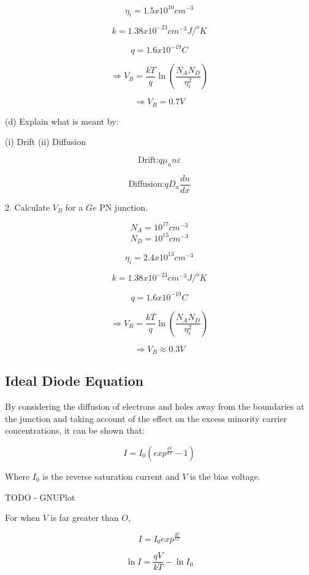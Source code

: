 \documentclass[a4paper,12pt]{article}
\begin{document}
\[ \eta_{i} = 1.5 x 10^{10} cm^{-3} \]

\[ k = 1.38 x 10^{-23} cm^{-3}  J/^{o}K \]

\[ q = 1.6 x 10^{-19} C \]

\[ \Rightarrow V_{B} = \frac{kT}{q} \ln{\left(\frac{N_{A}
N_{D}}{\eta_{i}^{2}}\right)}
\]

\[ \Rightarrow V_{B} = 0.7 V \]


(d) Explain what is meant by:

(i) Drift
(ii) Diffusion

\[ \mbox{Drift:} q \mu_{n} n \varepsilon \]

\[ \mbox{Diffusion:} q D_{n} \frac{dn}{dx} \]

2. Calculate $V_{B}$ for a $Ge$ PN junction.

\[ N_{A} = 10^{17} cm^{-3} \]
\[ N_{D} = 10^{15} cm^{-3} \]

\[ \eta_{i} = 2.4 x 10^{13} cm^{-3} \]

\[ k = 1.38 x 10^{-23} cm^{-3}  J/^{o}K \]

\[ q = 1.6 x 10^{-19} C \]

\[ \Rightarrow  V_{B} = \frac{kT}{q} \ln{\left(\frac{N_{A}
N_{D}}{\eta_{i}^{2}}\right)}
\]

\[ \Rightarrow V_{B} \approx 0.3V \]


\subsection{Ideal Diode Equation}

By considering the diffusion of electrons and holes away from the
boundaries at the junction and taking account of the effect on the
excess minority carrier concentrations, it can be shown that:

\[ I = I_{0} \left( exp^{\frac{q V}{kT}} - 1 \right) \]

Where $I_{0}$ is the reverse saturation current and $V$ is the bias
voltage.

\begin{table}[htbp]

TODO - GNUPlot

\end{table}

For when $V$ is far greater than $O$,

\[ I = I_{0} exp^{\frac{q V}{kT}} \]

\[ \ln{I} = \frac{q V}{kT} - \ln{I_{0}} \]
\end{document}
